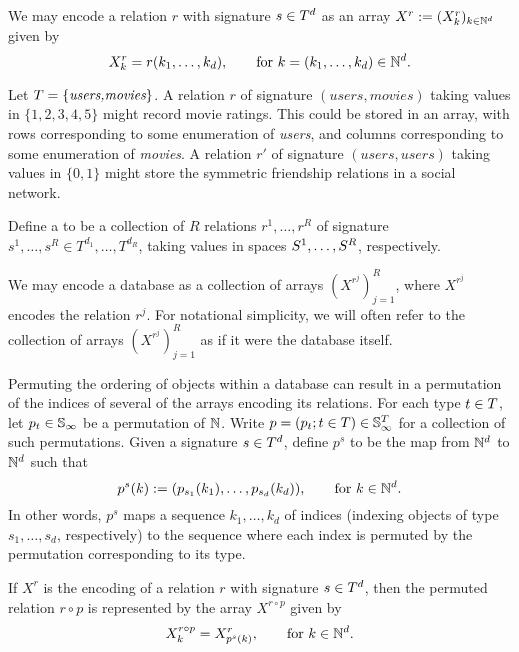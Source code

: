 We may encode a relation $r$ with signature $s \in T^d$ as an array $X^r := (X^r_{k})_{k \in \mathbb{N}^d}$ given by
\[
X^r_{k} = r(k_1,\dotsc,k_d), \qquad \text{for } k = (k_1,\dotsc, k_d) \in \mathbb{N}^d.
\]

\begin{example} 
Let $T = \{\textit{users,movies}\}$.
A relation $r$ of signature $(\textit{users},\textit{movies})$ taking values in $\{1,2,3,4,5\}$ might record movie ratings.
This could be stored in an array, with rows corresponding to some enumeration of \textit{users}, and columns corresponding to some enumeration of \textit{movies}. 
A relation $r'$ of signature $(\textit{users},\textit{users})$ taking values in $\{0,1\}$ might store the symmetric friendship relations in a social network.
\end{example}

\begin{definition}[database]
Define a  to be a collection of $R$ relations $r^1,\dotsc,r^R$ of signature $s^1,\dotsc,s^R \in T^{d_1},\dotsc,T^{d_R}$, taking values in spaces $S^1,\dotsc,S^R$, respectively.
\end{definition}

We may encode a database as a collection of arrays $(X^{r^j})_{j=1}^R$, where $X^{r^j}$ encodes the relation $r^j$.  
For notational simplicity, we will often refer to the collection of arrays $(X^{r^j})_{j=1}^R$ as if it were the database itself.

Permuting the ordering of objects within a database can result in a permutation of the indices of several of the arrays encoding its relations.
For each type $t \in T$, let $p_t \in \mathbb{S}_{\infty}$ be a permutation of $\mathbb{N}$. 
Write $p = (p_t ; t \in T) \in \mathbb{S}_{\infty}^T$ for a collection of such permutations.
Given a signature $s \in T^{d}$, define $p^s$ to be the map from $\mathbb{N}^{d}$ to $\mathbb{N}^{d}$ such that
\[
p^s(k) := (p_{s_1}(k_1), \dotsc,p_{s_{d}}(k_{d})), \qquad \text{for } k \in \mathbb{N}^{d}.
\]
In other words, $p^s$ maps a sequence $k_1,\dotsc,k_d$ of indices (indexing objects of type $s_1,\dotsc,s_d$, respectively) to the sequence where each index is permuted by the permutation corresponding to its type.

If $X^r$ is the encoding of a relation $r$ with signature $s \in T^d$, then the permuted relation $r \circ p$ is represented by the array $X^{r\circ p}$ given by
\[
X^{r \circ p}_{k} = X^r_{p^s(k)}, \qquad \text{for } k \in \mathbb{N}^d.
\]

